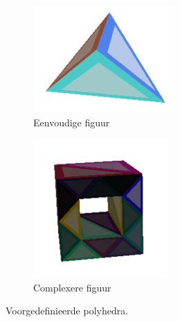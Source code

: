 \begin{figure}[h]
	\centering
	\begin{subfigure}{.5\textwidth}
		\centering
		\includegraphics[width=.4\linewidth]{4point.png}
		\caption{Eenvoudige figuur}
	\end{subfigure}%
	\begin{subfigure}{.5\textwidth}
		\centering
		\includegraphics[width=.4\linewidth]{hollowcube.png}
		\caption{Complexere figuur}
	\end{subfigure}
	\caption{Voorgedefinieerde polyhedra.}
	\label{fig: polyhedra}
\end{figure}
